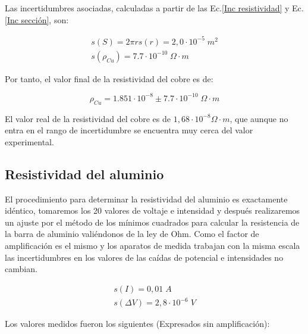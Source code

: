\documentclass[a4paper,12pt,titlepage]{article}
\begin{document}
Las incertidumbres asociadas, calculadas a partir de las Ec.\ref{Inc resistividad} y Ec.\ref{Inc sección}, son:

\begin{equation}
    \begin{gathered}
        s(S) = 2\pi r s(r) = 2,0 \cdot 10^{-5} \; m^2
        \\
        s(\rho_{Cu}) = 7.7 \cdot 10^{-10} \; \Omega \cdot m
    \end{gathered}
\end{equation}

Por tanto, el valor final de la resistividad del cobre es de:

\begin{equation}
    \rho_{Cu} = 1.851 \cdot 10^{-8} \pm 7.7 \cdot 10^{-10} \; \Omega \cdot m
\end{equation}

El valor real de la resistividad del cobre es de $1,68 \cdot 10^{-8} \Omega \cdot m$, que aunque no entra en el rango de incertidumbre se encuentra muy cerca del valor experimental.

\subsection{Resistividad del aluminio}

El procedimiento para determinar la resistividad del aluminio es exactamente idéntico, tomaremos los 20 valores de voltaje e intensidad y después realizaremos un ajuste por el método de los mínimos cuadrados para calcular la resistencia de la barra de aluminio valiéndonos de la ley de Ohm. Como el factor de amplificación es el mismo y los aparatos de medida trabajan con la misma escala las incertidumbres en los valores de las caídas de potencial e intensidades no cambian.

\begin{equation}
    \begin{gathered}
    s(I) = 0,01 \; A\\    
    s(\Delta V) = 2,8 \cdot 10^{-6} \; V
    \end{gathered}
\end{equation}

Los valores medidos fueron los siguientes (Expresados sin amplificación):
\end{document}
